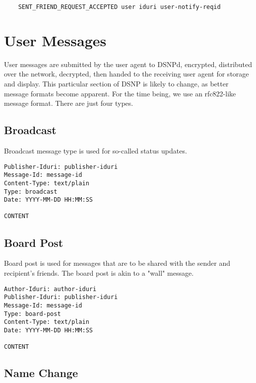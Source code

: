 \documentclass[letterpaper,11pt,oneside]{article}
\begin{document}
\vspace{10pt}
\begin{verbatim}
    SENT_FRIEND_REQUEST_ACCEPTED user iduri user-notify-reqid
\end{verbatim}
\vspace{10pt}

\section{User Messages}

User messages are submitted by the user agent to DSNPd, encrypted, distributed
over the network, decrypted, then handed to the receiving user agent for
storage and display. This particular section of DSNP is likely to change, as
better message formats become apparent. For the time being, we use an
rfc822-like message format. There are just four types.

\subsection{Broadcast}

Broadcast message type is used for so-called status updates.

\vspace{10pt}
\begin{verbatim}
Publisher-Iduri: publisher-iduri
Message-Id: message-id
Content-Type: text/plain
Type: broadcast
Date: YYYY-MM-DD HH:MM:SS

CONTENT
\end{verbatim}
\vspace{10pt}

\subsection{Board Post}

Board post is used for messages that are to be shared with the sender and
recipient's friends. The board post is akin to a "wall" message.

\vspace{10pt}
\begin{verbatim}
Author-Iduri: author-iduri
Publisher-Iduri: publisher-iduri
Message-Id: message-id
Type: board-post
Content-Type: text/plain
Date: YYYY-MM-DD HH:MM:SS

CONTENT
\end{verbatim}
\vspace{10pt}

\subsection{Name Change}
\end{document}
